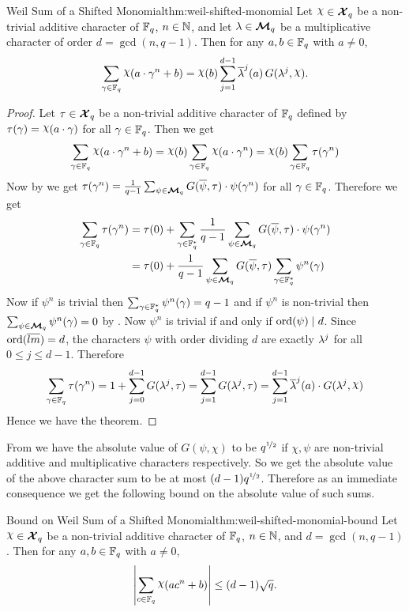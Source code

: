\begin{Theorem}{Weil Sum of a Shifted Monomial}{thm:weil-shifted-monomial}
  Let $\chi\in\Xq$ be a non-trivial additive character of $\mathbb{F}_q$, $n\in\mathbb{N}$, and let $\lambda\in\boldsymbol{\mathcal{M}}_q$ be a multiplicative character of order $d=\gcd(n,q-1)$. Then for any $a,b\in\mathbb{F}_q$ with $a\neq 0$,
  $$\sum_{\gm\in\bbF_q}\chi(a\cdot\gm^n+b)=\chi(b)\sum_{j=1}^{d-1}\ov{\lm}^j(a)\,G(\lm^j,\chi).$$
\end{Theorem}
\begin{proof}
  Let $\tau\in\boldsymbol{\mathcal{X}}_q$ be a non-trivial additive character of $\mathbb{F}_q$ defined by $\tau(\gm)=\chi(a\cdot \gm)$ for all $\gamma\in\mathbb{F}_q$. Then we get $$\sum_{\gm\in\bbF_q}\chi(a\cdot \gm^n+b)=\chi(b)\sum_{\gm\in\bbF_q}\chi(a\cdot \gm^n)=\chi(b)\sum_{\gm\in\bbF_q}\tau(\gm^n)$$
  Now by  we get $\tau(\gamma^n)=\frac1{q-1}\sum_{\psi\in\boldsymbol{\mathcal{M}}_q}G(\overline{\psi},\tau)\cdot \psi(\gamma^n)$ for all $\gamma\in\mathbb{F}_q$. Therefore we get \begin{align*}
    \sum_{\gamma\in\mathbb{F}_q}\tau(\gamma^n) & = \tau(0)+\sum_{\gamma\in\mathbb{F}_q^*}\frac1{q-1}\sum_{\psi\in\boldsymbol{\mathcal{M}}_q}G(\overline{\psi},\tau)\cdot \psi(\gamma^n)\\ 
    & = \tau(0)+\frac1{q-1}\sum_{\psi\in\boldsymbol{\mathcal{M}}_q}G(\overline{\psi},\tau)\sum_{\gamma\in\mathbb{F}_q^*}\psi^n(\gamma)
  \end{align*}
  Now if $\psi^n$ is trivial then $\sum_{\gamma\in\mathbb{F}_q^*}\psi^n(\gamma)=q-1$ and if $\psi^n$ is non-trivial then $\sum_{\psi\in\boldsymbol{\mathcal{M}}_q}\psi^n(\gamma)=0$ by \MultCharPropsthm[(i)]. Now $\psi^n$ is trivial if and only if $\operatorname{ord}(\psi)\mid d$. Since $\operatorname{ord}(\overline{lm})=d$, the characters $\psi$ with order dividing $d$ are exactly $\lambda^j$ for all $0\leq j\leq d-1$. Therefore $$\sum_{\gm\in\bbF_q}\tau(\gm^n)=1+\sum_{j=0}^{d-1}G(\lm^j,\tau) = \sum_{j=1}^{d-1}G(\lm^j,\tau)=\sum_{j=1}^{d-1}\ov{\lm}^j(a)\cdot G(\lm^j,\chi)$$Hence we have the theorem. 
\end{proof}

From \GSpropthm we have the absolute value of $G(\psi,\chi)$ to be $q^{\nicefrac12}$ if $\chi,\psi$ are non-trivial additive and multiplicative characters respectively. So we get the absolute value of the above character sum to be at most $(d-1)q^{\nicefrac12}$. Therefore as an immediate consequence we get the following bound on the absolute value of such sums.

\begin{Theorem}{Bound on Weil Sum of a Shifted Monomial}{thm:weil-shifted-monomial-bound}
  Let $\chi\in\Xq$ be a non-trivial additive character of $\mathbb{F}_q$, $n\in\mathbb{N}$, and $d=\gcd(n,q-1)$. Then for any $a,b\in\mathbb{F}_q$ with $a\neq 0$,
  $$\lt|\sum_{c\in\bbF_q}\chi(ac^n+b)\rt|\leq (d-1)\sqrt{q}.$$
\end{Theorem}


